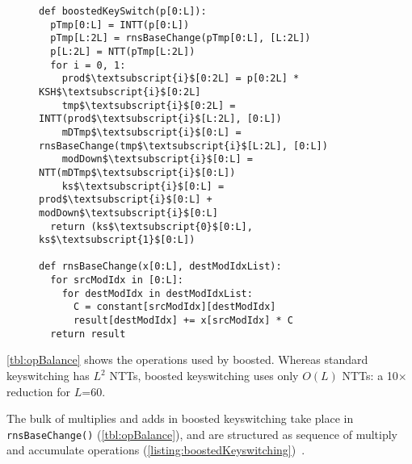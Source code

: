 
    \begin{figure}\label{lst:boostedKeyswitching}
      \begin{center}
          \begin{lstlisting}[caption={Boosted keyswitching implementation (1-digit).}, mathescape=true, label=listing:boostedKeyswitching]
def boostedKeySwitch(p[0:L]):
  pTmp[0:L] = INTT(p[0:L])
  pTmp[L:2L] = rnsBaseChange(pTmp[0:L], [L:2L])
  p[L:2L] = NTT(pTmp[L:2L])
  for i = 0, 1:
    prod$\textsubscript{i}$[0:2L] = p[0:2L] * KSH$\textsubscript{i}$[0:2L]
    tmp$\textsubscript{i}$[0:2L] = INTT(prod$\textsubscript{i}$[L:2L], [0:L])
    mDTmp$\textsubscript{i}$[0:L] = rnsBaseChange(tmp$\textsubscript{i}$[L:2L], [0:L])
    modDown$\textsubscript{i}$[0:L] = NTT(mDTmp$\textsubscript{i}$[0:L])
    ks$\textsubscript{i}$[0:L] = prod$\textsubscript{i}$[0:L] + modDown$\textsubscript{i}$[0:L]
  return (ks$\textsubscript{0}$[0:L], ks$\textsubscript{1}$[0:L])

def rnsBaseChange(x[0:L], destModIdxList):
  for srcModIdx in [0:L]:
    for destModIdx in destModIdxList:
      C = constant[srcModIdx][destModIdx]
      result[destModIdx] += x[srcModIdx] * C
  return result
          \end{lstlisting}
        \end{center}
	\vspace{6pt}
      \end{figure}

\tblOpBalance

\autoref{tbl:opBalance} shows the operations used by boosted.
Whereas standard keyswitching has $L^2$ NTTs, boosted keyswitching uses only $O(L)$ NTTs:
a 10$\times$ reduction for $L$=60. 

The bulk of multiplies and adds in boosted keyswitching take place in \verb!rnsBaseChange()!
(\autoref{tbl:opBalance}), and are structured as sequence of multiply and accumulate
operations (\autoref{listing:boostedKeyswitching})~\cite{bajard:2016:full}.

